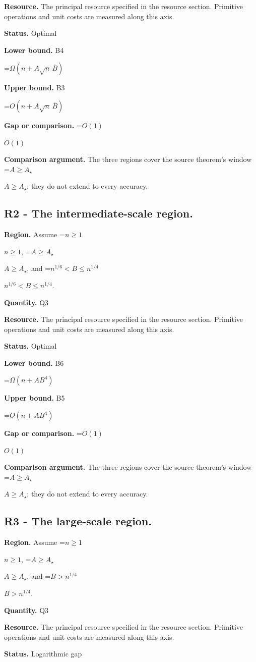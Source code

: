 \documentclass[10pt,a4paper]{article}
\newcommand{\AtlasMath}[1]{\par\begingroup\centering\setbox0=\hbox{$\displaystyle #1$}\ifdim\wd0>1.4\linewidth\typeout{ATLAS WIDE FORMULA: \the\wd0}\fi\ifdim\wd0>\linewidth\resizebox{\linewidth}{!}{\box0}\else\box0\fi\par\endgroup}
\newcommand{\AtlasInlineMath}[1]{\begingroup\setbox0=\hbox{$#1$}\ifdim\wd0>.4\linewidth\endgroup\AtlasMath{#1}\else\endgroup$#1$\fi}
\begin{document}
\textbf{Resource.} The principal resource specified in the resource section. Primitive operations and unit costs are measured along this axis.

\textbf{Status.} Optimal

\textbf{Lower bound.} B4

\AtlasMath{\Omega(n+A\sqrt n\,\overline B)}
\textbf{Upper bound.} B3

\AtlasMath{O(n+A\sqrt n\,\overline B)}
\textbf{Gap or comparison.} \AtlasInlineMath{O(1)}

\textbf{Comparison argument.} The three regions cover the source theorem's window \AtlasInlineMath{A\ge A_\star}; they do not extend to every accuracy.

\subsection{R2 - The intermediate-scale region.}
\textbf{Region.} Assume \AtlasInlineMath{n\ge1}, \AtlasInlineMath{A\ge A_\star}, and \AtlasInlineMath{n^{1/6}<B\le n^{1/4}}.

\textbf{Quantity.} Q3

\textbf{Resource.} The principal resource specified in the resource section. Primitive operations and unit costs are measured along this axis.

\textbf{Status.} Optimal

\textbf{Lower bound.} B6

\AtlasMath{\Omega(n+AB^4)}
\textbf{Upper bound.} B5

\AtlasMath{O(n+AB^4)}
\textbf{Gap or comparison.} \AtlasInlineMath{O(1)}

\textbf{Comparison argument.} The three regions cover the source theorem's window \AtlasInlineMath{A\ge A_\star}; they do not extend to every accuracy.

\subsection{R3 - The large-scale region.}
\textbf{Region.} Assume \AtlasInlineMath{n\ge1}, \AtlasInlineMath{A\ge A_\star}, and \AtlasInlineMath{B>n^{1/4}}.

\textbf{Quantity.} Q3

\textbf{Resource.} The principal resource specified in the resource section. Primitive operations and unit costs are measured along this axis.

\textbf{Status.} Logarithmic gap
\end{document}

